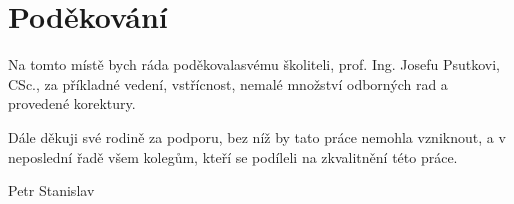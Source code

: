 \chapter*{Poděkování}

\noindent Na tomto místě bych ráda poděkovalasvému školiteli, prof. Ing. Josefu Psutkovi, CSc., za příkladné vedení, vstřícnost, nemalé množství odborných rad a provedené korektury.

\vspace*{1cm}

\noindent Dále děkuji své rodině za podporu, bez níž by tato práce nemohla vzniknout, a v neposlední řadě všem kolegům, kteří se podíleli na zkvalitnění této práce.

\vspace*{1cm}
\noindent \hspace*{12cm} {Petr Stanislav}


